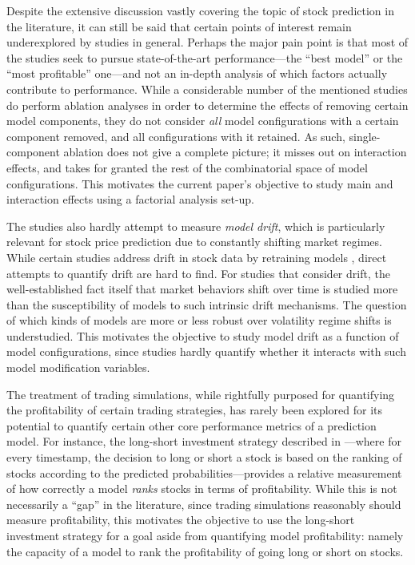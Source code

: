 \documentclass[stu,floatsintext]{apa7}
\begin{document}
Despite the extensive discussion vastly covering the topic of stock prediction in the literature, it can still be said that certain points of interest remain underexplored by studies in general. Perhaps the major pain point is that most of the studies seek to pursue state-of-the-art performance—the ``best model'' or the ``most profitable'' one—and not an in-depth analysis of which factors actually contribute to performance. While a considerable number of the mentioned studies do perform ablation analyses in order to determine the effects of removing certain model components, they do not consider \textit{all} model configurations with a certain component removed, and all configurations with it retained. As such, single-component ablation does not give a complete picture; it misses out on interaction effects, and takes for granted the rest of the combinatorial space of model configurations. This motivates the current paper's objective to study main and interaction effects using a factorial analysis set-up.

The studies also hardly attempt to measure \textit{model drift}, which is particularly relevant for stock price prediction due to constantly shifting market regimes. While certain studies address drift in stock data by retraining models \parencite{pulicharla2019detecting}, direct attempts to quantify drift are hard to find. For studies that consider drift, the well-established fact itself that market behaviors shift over time is studied more than the susceptibility of models to such intrinsic drift mechanisms. The question of which kinds of models are more or less robust over volatility regime shifts is understudied. This motivates the objective to study model drift as a function of model configurations, since studies hardly quantify whether it interacts with such model modification variables.

The treatment of trading simulations, while rightfully purposed for quantifying the profitability of certain trading strategies, has rarely been explored for its potential to quantify certain other core performance metrics of a prediction model. For instance, the long-short investment strategy described in \textcite{mandal2023enhancing}—where for every timestamp, the decision to long or short a stock is based on the ranking of stocks according to the predicted probabilities—provides a relative measurement of how correctly a model \textit{ranks} stocks in terms of profitability. While this is not necessarily a ``gap'' in the literature, since trading simulations reasonably should measure profitability, this motivates the objective to use the long-short investment strategy for a goal aside from quantifying model profitability: namely the capacity of a model to rank the profitability of going long or short on stocks.
\end{document}
